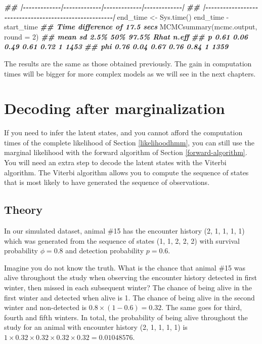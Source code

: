 \documentclass[
  12pt,
]{krantz}
\newenvironment{Shaded}{\begin{snugshade}}{\end{snugshade}}
\newcommand{\AttributeTok}[1]{\textcolor[rgb]{0.77,0.63,0.00}{#1}}
\newcommand{\DecValTok}[1]{\textcolor[rgb]{0.00,0.00,0.81}{#1}}
\newcommand{\DocumentationTok}[1]{\textcolor[rgb]{0.56,0.35,0.01}{\textbf{\textit{#1}}}}
\newcommand{\FunctionTok}[1]{\textcolor[rgb]{0.00,0.00,0.00}{#1}}
\newcommand{\NormalTok}[1]{#1}
\newcommand{\OtherTok}[1]{\textcolor[rgb]{0.56,0.35,0.01}{#1}}
\newcommand{\SpecialCharTok}[1]{\textcolor[rgb]{0.00,0.00,0.00}{#1}}
\begin{document}
\begin{Shaded}
\begin{Highlighting}[]
\DocumentationTok{\#\# |{-}{-}{-}{-}{-}{-}{-}{-}{-}{-}{-}{-}{-}|{-}{-}{-}{-}{-}{-}{-}{-}{-}{-}{-}{-}{-}|{-}{-}{-}{-}{-}{-}{-}{-}{-}{-}{-}{-}{-}|{-}{-}{-}{-}{-}{-}{-}{-}{-}{-}{-}{-}{-}|}
\DocumentationTok{\#\# |{-}{-}{-}{-}{-}{-}{-}{-}{-}{-}{-}{-}{-}{-}{-}{-}{-}{-}{-}{-}{-}{-}{-}{-}{-}{-}{-}{-}{-}{-}{-}{-}{-}{-}{-}{-}{-}{-}{-}{-}{-}{-}{-}{-}{-}{-}{-}{-}{-}{-}{-}{-}{-}{-}{-}|}
\NormalTok{end\_time }\OtherTok{\textless{}{-}} \FunctionTok{Sys.time}\NormalTok{()}
\NormalTok{end\_time }\SpecialCharTok{{-}}\NormalTok{ start\_time}
\DocumentationTok{\#\# Time difference of 17.5 secs}
\FunctionTok{MCMCsummary}\NormalTok{(mcmc.output, }\AttributeTok{round =} \DecValTok{2}\NormalTok{)}
\DocumentationTok{\#\#     mean   sd 2.5\%  50\% 97.5\% Rhat n.eff}
\DocumentationTok{\#\# p   0.61 0.06 0.49 0.61  0.72    1  1453}
\DocumentationTok{\#\# phi 0.76 0.04 0.67 0.76  0.84    1  1359}
\end{Highlighting}
\end{Shaded}

The results are the same as those obtained previously. The gain in computation times will be bigger for more complex models as we will see in the next chapters.

\hypertarget{decoding}{%
\section{Decoding after marginalization}\label{decoding}}

If you need to infer the latent states, and you cannot afford the computation times of the complete likelihood of Section \ref{likelihoodhmm}, you can still use the marginal likelihood with the forward algorithm of Section \ref{forward-algorithm}. You will need an extra step to decode the latent states with the Viterbi algorithm. The Viterbi algorithm allows you to compute the sequence of states that is most likely to have generated the sequence of observations.

\hypertarget{viterbi-theory}{%
\subsection{Theory}\label{viterbi-theory}}

In our simulated dataset, animal \#15 has the encounter history (2, 1, 1, 1, 1) which was generated from the sequence of states (1, 1, 2, 2, 2) with survival probability \(\phi = 0.8\) and detection probability \(p = 0.6\).

Imagine you do not know the truth. What is the chance that animal \#15 was alive throughout the study when observing the encounter history detected in first winter, then missed in each subsequent winter? The chance of being alive in the first winter and detected when alive is 1. The chance of being alive in the second winter and non-detected is \(0.8 \times (1-0.6) = 0.32\). The same goes for third, fourth and fifth winters. In total, the probability of being alive throughout the study for an animal with encounter history (2, 1, 1, 1, 1) is \(1 \times 0.32 \times 0.32 \times 0.32 \times 0.32 = 0.01048576\).
\end{document}
